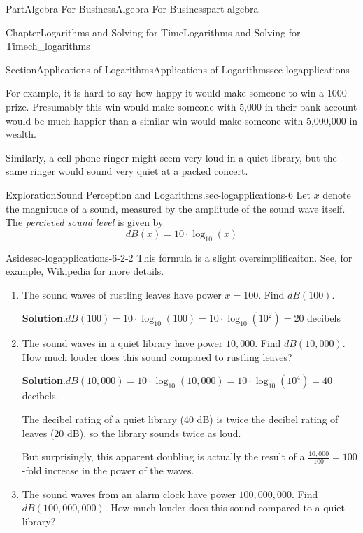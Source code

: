 \documentclass{tufte-book}
\newcommand{\blocktitlefont}{\relax}
\numberwithin{equation}{chapter}
\begin{document}
\begin{partptx}{Part}{Algebra For Business}{}{Algebra For Business}{}{}{part-algebra}
\begin{chapterptx}{Chapter}{Logarithms and Solving for Time}{}{Logarithms and Solving for Time}{}{}{ch_logarithms}
\begin{sectionptx}{Section}{Applications of Logarithms}{}{Applications of Logarithms}{}{}{sec-logapplications}
\par
For example, it is hard to say how happy it would make someone to win a \textdollar{}1000 prize. Presumably this win would make someone with \textdollar{}5,000 in their bank account would be much happier than a similar win would make someone with \textdollar{}5,000,000 in wealth.%
\par
Similarly, a cell phone ringer might seem very loud in a quiet library, but the same ringer would sound very quiet at a packed concert.%
\begin{exploration}{Exploration}{Sound Perception and Logarithms.}{sec-logapplications-6}%
Let \(x\) denote the magnitude of a sound, measured by the amplitude of the sound wave itself. The \emph{percieved sound level} is given by%
\begin{equation*}
dB(x) = 10\cdot \log_{10}(x)
\end{equation*}
%
\begin{aside}{Aside}{}{sec-logapplications-6-2-2}%
This formula is a slight oversimplificaiton.  See, for example, \href{https://en.wikipedia.org/wiki/Decibel\#Perception}{Wikipedia}\footnotemark{} for more details.%
\end{aside}
\begin{enumerate}[font=\bfseries,label=(\alph*),ref=\alph*]%
\item{}The sound waves of rustling leaves have power \(x=100\). Find \(dB(100)\).%
\par\smallskip%
\noindent\textbf{\blocktitlefont Solution}.\hypertarget{sec-logapplications-6-3-2}{}\quad{}\(dB(100)=10\cdot\log_{10}(100) = 10\cdot\log_{10}(10^2)  = 20\) decibels%
\item{}The sound waves in a quiet library have power \(10,000\). Find \(dB(10,000)\). How much louder does this sound compared to rustling leaves?%
\par\smallskip%
\noindent\textbf{\blocktitlefont Solution}.\hypertarget{sec-logapplications-6-4-2}{}\quad{}\(dB(10,000)=10\cdot\log_{10}(10,000) = 10\cdot\log_{10}(10^4) = 40\) decibels.%
\par
The decibel rating of a quiet library (40 dB) is twice the decibel rating of leaves (20 dB), so the library sounds twice as loud.%
\par
But surprisingly, this apparent doubling is actually the result of a \(\frac{10,000}{100}=100\)-fold increase in the power of the waves.%
\item{}The sound waves from an alarm clock have power \(100,000,000\). Find \(dB(100,000,000)\). How much louder does this sound compared to a quiet library?%

\end{enumerate}
\end{exploration}
\end{sectionptx}
\end{chapterptx}
\end{partptx}
\end{document}
